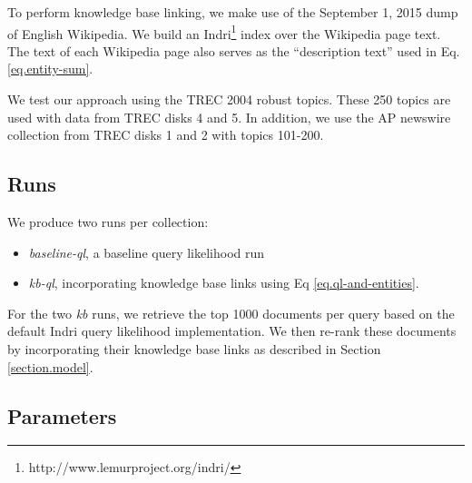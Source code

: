 \documentclass{sig-alternate}
\begin{document}
To perform knowledge base linking, we make use of the September 1, 2015 dump of English Wikipedia. We build an Indri\footnote{http://www.lemurproject.org/indri/} index over the Wikipedia page text. The text of each Wikipedia page also serves as the ``description text'' used in Eq. \ref{eq.entity-sum}.

We test our approach using the TREC 2004 robust topics. These 250 topics are used with data from TREC disks 4 and 5. In addition, we use the AP newswire collection from TREC disks 1 and 2 with topics 101-200. %

\subsection{Runs}\label{section.evaluation.runs}


We produce two runs per collection:
\begin{itemize}
	\item \textit{baseline-ql}, a baseline query likelihood run
	\item \textit{kb-ql}, incorporating knowledge base links using Eq \ref{eq.ql-and-entities}.
\end{itemize}

For the two \textit{kb} runs, we retrieve the top 1000 documents per query based on the default Indri query likelihood implementation. We then re-rank these documents by incorporating their knowledge base links as described in Section \ref{section.model}. 

\subsection{Parameters}\label{section.evaluation.parameters}
\end{document}

